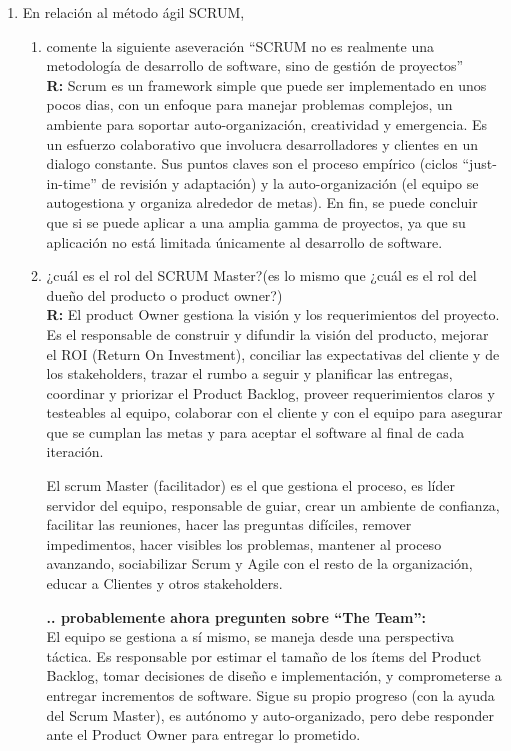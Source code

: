 \begin{enumerate}
	\item En relación al método ágil SCRUM,
		\begin{enumerate}
			\item comente la siguiente aseveración “SCRUM no es realmente una metodología de desarrollo de software, sino de gestión de proyectos”\\
	\textbf{R:}
				Scrum es un framework simple que puede ser implementado en unos pocos dias, con un enfoque para
				manejar problemas complejos, un ambiente para soportar auto-organización, creatividad y emergencia. Es un
				esfuerzo colaborativo que involucra desarrolladores y clientes en un dialogo constante.
				Sus puntos claves son el proceso empírico (ciclos ``just-in-time'' de revisión y adaptación) y la
				auto-organización (el equipo se autogestiona y organiza alrededor de metas).
				En fin, se puede concluir que si se puede aplicar a una amplia gamma de proyectos, ya
				que su aplicación no está limitada únicamente al desarrollo de software.

			\item ¿cuál es el rol del SCRUM Master?(es lo mismo que ¿cuál es el rol del dueño del producto o product owner?)\\
	\textbf{R:}
				El product Owner gestiona la visión y los requerimientos del proyecto. Es el responsable de construir y
				difundir la visión del producto, mejorar el ROI (Return On Investment), conciliar las expectativas del
				cliente y de los stakeholders, trazar el rumbo a seguir y planificar las entregas, coordinar y priorizar
				el Product Backlog, proveer requerimientos claros y testeables al equipo, colaborar con el cliente y con
				el equipo para asegurar que se cumplan las metas y para aceptar el software al final de cada iteración.
				
				El scrum Master (facilitador) es el que gestiona el proceso, es líder servidor del equipo, responsable de
				guiar, crear un ambiente de confianza, facilitar las reuniones, hacer las preguntas difíciles, remover
				impedimentos, hacer visibles los problemas, mantener al proceso avanzando, sociabilizar Scrum y Agile con
				el resto de la organización, educar a Clientes y otros stakeholders.

				\textbf{.. probablemente ahora pregunten sobre ``The Team'':}\\
				El equipo se gestiona a sí mismo, se maneja desde una perspectiva táctica. Es responsable por estimar el
				tamaño de los ítems del Product Backlog, tomar decisiones de diseño e implementación, y comprometerse a
				entregar incrementos de software. Sigue su propio progreso (con la ayuda del Scrum Master), es autónomo y
				auto-organizado, pero debe responder ante el Product Owner para entregar lo prometido.


\end{enumerate}
\end{enumerate}
